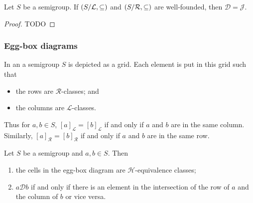 \begin{proposition}
Let $S$ be a semigroup. If $\left( S/\mathcal{L}, \subseteq \right)$ and $\left( S/\mathcal{R}, \subseteq \right)$ are well-founded, then $\mathcal{D} = \mathcal{J}$.
\end{proposition}
\begin{proof}
TODO
\end{proof}

\subsubsection{Egg-box diagrams}
\begin{definition}
In an  a semigroup $S$ is depicted as a grid. Each element is put in this grid such that
\begin{itemize}
\item the rows are $\mathcal{R}$-classes; and
\item the columns are $\mathcal{L}$-classes.
\end{itemize} 
\end{definition}

Thus for $a,b\in S$, $[a]_\mathcal{L} = [b]_\mathcal{L}$ if and only if $a$ and $b$ are in the same column. Similarly, $[a]_\mathcal{R} = [b]_\mathcal{R}$ if and only if $a$ and $b$ are in the same row.

\begin{lemma}
Let $S$ be a semigroup and $a,b\in S$. Then
\begin{enumerate}
\item the cells in the egg-box diagram are $\mathcal{H}$-equivalence classes;
\item $a\mathcal{D}b$ \textup{if and only if} there is an element in the intersection of the row of $a$ and the column of $b$ or vice versa.
\end{enumerate}
\end{lemma}

